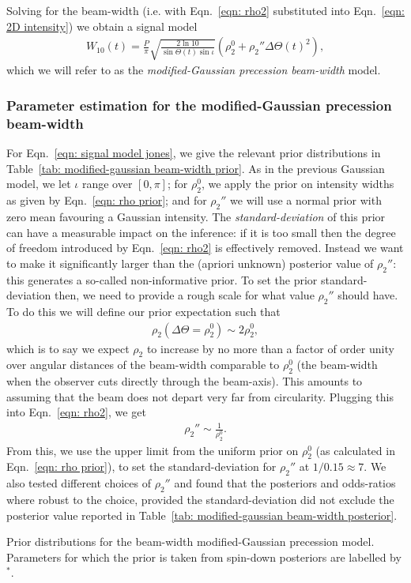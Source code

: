 \documentclass[../full_thesis/full_thesis.tex]{subfiles}
\newcommand{\thisdir}{../comparing_periodic_modulations}
\begin{document}
Solving for the beam-width (i.e. with Eqn.~\eqref{eqn: rho2} substituted into
Eqn.~\eqref{eqn: 2D intensity}) we obtain a signal model
\begin{align}
W_{10}(t) = \frac{P}{\pi}\sqrt{\frac{2\ln10}{\sin\Theta(t)\sin\iota}}
 \left(\rho_2^{0} + \rho_2'' \Delta\Theta(t)^{2} \right),
\label{eqn: signal model jones}
\end{align}
which we will refer to as the \emph{modified-Gaussian precession beam-width} model.

\subsubsection{Parameter estimation for the modified-Gaussian precession
               beam-width}

For Eqn.~\eqref{eqn: signal model jones}, we give the relevant prior distributions
in Table~\ref{tab: modified-gaussian beam-width prior}. As in the previous
Gaussian model, we let $\iota$ range over $[0, \pi]$; for $\rho_2^{0}$, we
apply the prior on intensity widths as given by Eqn.~\eqref{eqn: rho
prior}; and for $\rho_2''$ we will use a normal prior with zero mean
favouring a Gaussian intensity. The \emph{standard-deviation} of this prior can
have a measurable impact on the inference: if it is too small then the degree
of freedom introduced by Eqn.~\ref{eqn: rho2} is effectively removed. Instead
we want to make it significantly larger than the (apriori unknown) posterior
value of $\rho_2''$: this generates a so-called non-informative prior. To set
the prior standard-deviation then, we need to provide a rough scale for what
value $\rho_{2}''$ should have. To do this we will define our prior expectation
such that
\begin{align}
\rho_2(\Delta\Theta = \rho_2^0) \sim 2\rho_2^0,
\label{eqn: rho2 prior}
\end{align}
which is to say we expect $\rho_2$ to increase by no more than a factor of
order unity over angular distances of the beam-width comparable to $\rho_2^0$
(the beam-width when the observer cuts directly through the beam-axis). This
amounts to assuming that the beam does not depart very far from circularity.
Plugging this into Eqn.~\eqref{eqn: rho2}, we get
\begin{align}
\rho_2'' \sim \frac{1}{\rho_2^0}.
\label{eqn: rho2dd prior}
\end{align}
From this, we use the upper limit from the uniform prior on $\rho_2^0$ (as calculated in
Eqn.~\eqref{eqn: rho prior}), to set the
standard-deviation for $\rho_2''$ at $1/0.15\approx7$.
We also tested different choices of $\rho_2''$ and found that the
posteriors and odds-ratios where robust to the choice, provided the
standard-deviation did not exclude the posterior value reported in
Table~\ref{tab: modified-gaussian beam-width posterior}.
\begin{table}
\centering
\caption{Prior distributions for the beam-width modified-Gaussian precession
model. Parameters for which the prior is taken from spin-down posteriors are
labelled by $^{*}$.}
\label{tab: modified-gaussian beam-width prior}

\end{table}
\end{document}
